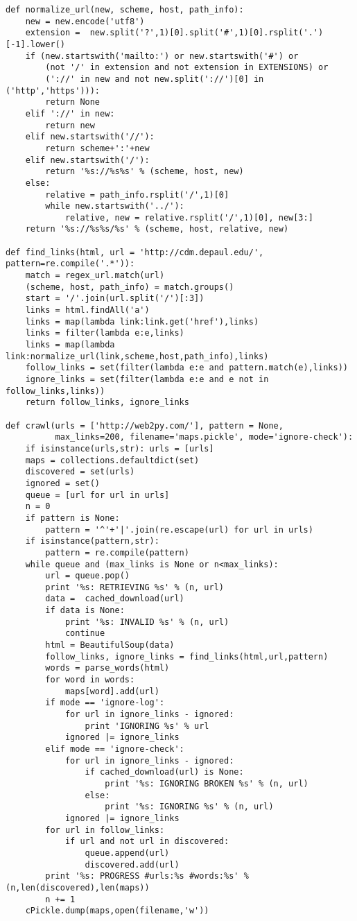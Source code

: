 \documentclass[justified,sixbynine]{tufte-book}
\theoremstyle{plain}%
\theoremstyle{definition}
\theoremstyle{remark}
\begin{document}
\begin{fullwidth}
\begin{lstlisting}
def normalize_url(new, scheme, host, path_info):
    new = new.encode('utf8')
    extension =  new.split('?',1)[0].split('#',1)[0].rsplit('.')[-1].lower()
    if (new.startswith('mailto:') or new.startswith('#') or
        (not '/' in extension and not extension in EXTENSIONS) or
        ('://' in new and not new.split('://')[0] in ('http','https'))):
        return None
    elif '://' in new:
        return new
    elif new.startswith('//'):
        return scheme+':'+new
    elif new.startswith('/'):
        return '%s://%s%s' % (scheme, host, new)
    else:
        relative = path_info.rsplit('/',1)[0]
        while new.startswith('../'):
            relative, new = relative.rsplit('/',1)[0], new[3:]
    return '%s://%s%s/%s' % (scheme, host, relative, new)

def find_links(html, url = 'http://cdm.depaul.edu/', pattern=re.compile('.*')):
    match = regex_url.match(url)
    (scheme, host, path_info) = match.groups()
    start = '/'.join(url.split('/')[:3])
    links = html.findAll('a')
    links = map(lambda link:link.get('href'),links)
    links = filter(lambda e:e,links)
    links = map(lambda link:normalize_url(link,scheme,host,path_info),links)
    follow_links = set(filter(lambda e:e and pattern.match(e),links))
    ignore_links = set(filter(lambda e:e and e not in follow_links,links))
    return follow_links, ignore_links

def crawl(urls = ['http://web2py.com/'], pattern = None,
          max_links=200, filename='maps.pickle', mode='ignore-check'):
    if isinstance(urls,str): urls = [urls]
    maps = collections.defaultdict(set)
    discovered = set(urls)
    ignored = set()
    queue = [url for url in urls]
    n = 0
    if pattern is None:
        pattern = '^'+'|'.join(re.escape(url) for url in urls)
    if isinstance(pattern,str):
        pattern = re.compile(pattern)
    while queue and (max_links is None or n<max_links):
        url = queue.pop()
        print '%s: RETRIEVING %s' % (n, url)
        data =  cached_download(url)
        if data is None:
            print '%s: INVALID %s' % (n, url)
            continue
        html = BeautifulSoup(data)
        follow_links, ignore_links = find_links(html,url,pattern)
        words = parse_words(html)
        for word in words:
            maps[word].add(url)
        if mode == 'ignore-log':
            for url in ignore_links - ignored:
                print 'IGNORING %s' % url
            ignored |= ignore_links
        elif mode == 'ignore-check':
            for url in ignore_links - ignored:
                if cached_download(url) is None:
                    print '%s: IGNORING BROKEN %s' % (n, url)
                else:
                    print '%s: IGNORING %s' % (n, url)
            ignored |= ignore_links
        for url in follow_links:
            if url and not url in discovered:
                queue.append(url)
                discovered.add(url)
        print '%s: PROGRESS #urls:%s #words:%s' % (n,len(discovered),len(maps))
        n += 1
    cPickle.dump(maps,open(filename,'w'))


\end{lstlisting}
\end{fullwidth}
\end{document}
